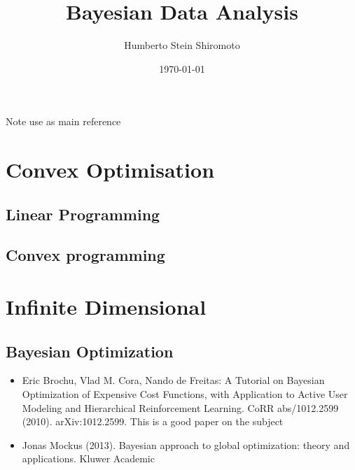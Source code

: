 \documentclass[sfsidenotes,notoc,nobib,a4paper]{tufte-book}
\title{Bayesian Data Analysis}
\author{Humberto Stein Shiromoto}
\date{\today}
\begin{document}
\setcounter{tocdepth}{1}
\maketitle




\tableofcontents
\adjustmtc
\printnomenclature

Note use \citep{Liberzon2012} as main reference

\part{Convex Optimisation}

\chapter{Linear Programming}

\chapter{Convex programming}

\part{Infinite Dimensional}

\chapter{Bayesian Optimization}

\begin{itemize}
	\item Eric Brochu, Vlad M. Cora, Nando de Freitas: A Tutorial on 
	Bayesian Optimization of Expensive Cost Functions, with Application
	 to Active User Modeling and Hierarchical Reinforcement Learning. 
	 CoRR abs/1012.2599 (2010). arXiv:1012.2599. This is a good paper on
	 the subject

	\item Jonas Mockus (2013). Bayesian approach to global optimization: 
	theory and applications. Kluwer Academic
\end{itemize}

\appendix
%



\printbibliography[heading=bibintoc]
\printindex
\end{document}
